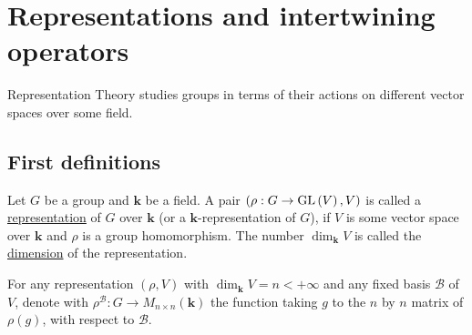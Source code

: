 \chapter{Representations and intertwining operators}
Representation Theory studies groups in terms of their actions on different vector spaces over some field.

\section{First definitions}

\begin{definition} Let $G$ be a group and $\mathbf{k}$ be a field. A pair $(\rho:G\to\GL{V},V)$ is called a \ul{representation} of $G$ over $\mathbf{k}$ (or a $\mathbf{k}$-representation of $G$), if $V$ is some vector space over $\mathbf{k}$ and $\rho$ is a group homomorphism. The number $\dim_{\mathbf{k}}V$ is called the \ul{dimension} of the representation.

For any representation $(\rho,V)$ with $\dim_{\mathbf{k}}V=n<+\infty$ and any fixed basis $\mathcal{B}$ of $V$, denote with $\rho^{\mathcal{B}}:G\to M_{n\times n}(\mathbf{k})$ the function taking $g$ to the $n$ by $n$ matrix of $\rho(g)$, with respect to $\mathcal{B}$.
\end{definition}
